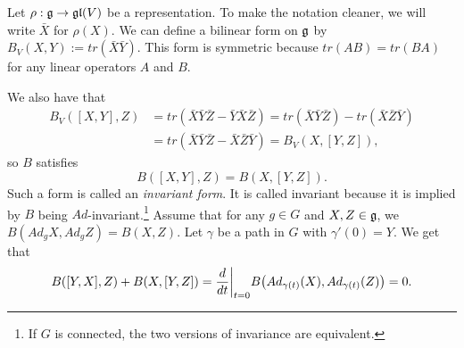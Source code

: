  \setcounter{lecture}{12}



 Let $\rho:\mathfrak{g}\to \mathfrak{gl}(V)$ be a representation. To make the notation cleaner, we will
 write $\bar X$ for $\rho(X)$. We can define a bilinear form on $\mathfrak{g}$ by $B_V(X,Y):=
 tr(\bar X \bar Y)$. This form is symmetric because $tr(AB)=tr(BA)$ for any linear
 operators $A$ and $B$.

 We also have that
 \begin{align*}
 B_V([X,Y],Z) &= tr(\bar X\bar Y\bar Z-\bar Y\bar X\bar Z) = tr(\bar X\bar Y\bar Z) - tr(\bar X\bar Z\bar Y)\\
            &=tr(\bar X\bar Y\bar Z-\bar X\bar Z\bar Y)=B_V(X,[Y,Z]),
 \end{align*}
 so $B$ satisfies
 \[
    B([X,Y],Z) = B(X,[Y,Z]).
 \]
 Such a form is called an \emph{invariant form}. It is called invariant because it is
 implied by $B$ being $Ad$-invariant.\footnote{If $G$ is connected, the two versions of
 invariance are equivalent.} Assume that for any $g\in G$ and $X,Z\in \mathfrak{g}$, we
 $B(Ad_g X,Ad_g Z)=B(X,Z)$. Let $\gamma$ be a path in $G$ with $\gamma'(0)=Y$. We get
 that
 \[
    B([Y,X],Z)+B(X,[Y,Z]) = \frac{d }{d t}\bigg|_{t=0}
        B\bigl(Ad_{\gamma(t)}(X),Ad_{\gamma(t)}(Z)\bigr) = 0.
 \]



%
%

